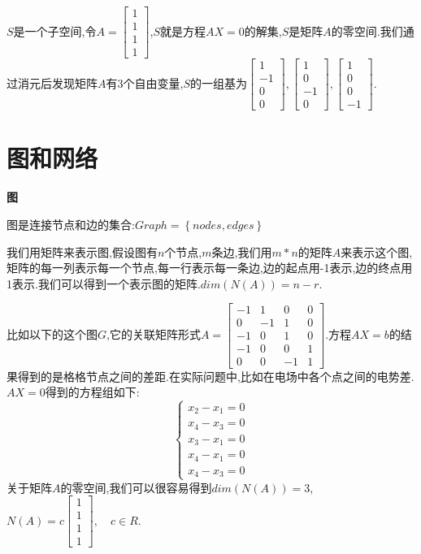 \documentclass[oneside]{book}
\begin{document}
$S$是一个子空间,令$A=\left[\begin{array}{cccc}
	1\\1\\1\\1
\end{array}\right]$,$S$就是方程$AX=0$的解集,$S$是矩阵$A$的零空间.我们通过消元后发现矩阵$A$有3个自由变量,$S$的一组基为$\left[\begin{array}{c}
1\\-1\\0\\0
\end{array}\right],\left[\begin{array}{c}
1\\0\\-1\\0
\end{array}\right],\left[\begin{array}{c}
1\\0\\0\\-1
\end{array}\right]$.

	\chapter{图和网络}
	\textbf{图}
	
	图是连接节点和边的集合:$Graph=\left\{nodes,edges\right\}$
	
	我们用矩阵来表示图,假设图有$n$个节点,$m$条边,我们用$m*n$的矩阵$A$来表示这个图,矩阵的每一列表示每一个节点,每一行表示每一条边,边的起点用-1表示,边的终点用1表示.我们可以得到一个表示图的矩阵.\quad $dim(N(A))=n-r$.
	
	比如以下的这个图$G$,它的关联矩阵形式$A=\left[\begin{array}{cccc}
		-1&1&0&0\\0&-1&1&0\\-1&0&1&0\\-1&0&0&1\\0&0&-1&1
	\end{array}\right]$.方程$AX=b$的结果得到的是格格节点之间的差距.在实际问题中,比如在电场中各个点之间的电势差.$AX=0$得到的方程组如下:
$$\left\{\begin{array}{c}
	x_{2}-x_{1}=0\\x_{4}-x_{3}=0\\x_{3}-x_{1}=0\\x_{4}-x_{1}=0\\x_{4}-x_{3}=0
\end{array}\right.$$
关于矩阵$A$的零空间,我们可以很容易得到$dim(N(A))=3$,$N(A)=c\left[\begin{array}{c}
	1\\1\\1\\1
\end{array}\right],\quad c\in R$.
\end{document}
